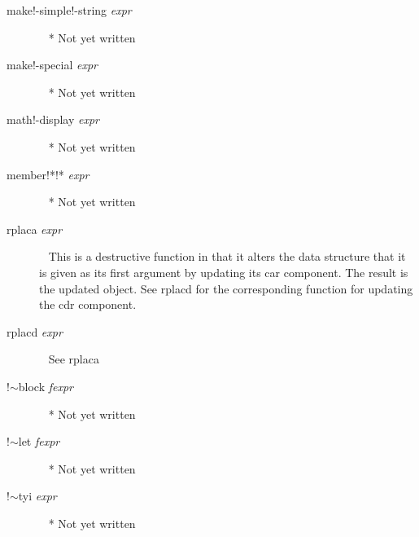\documentclass[a4paper,11pt]{article}
\begin{document}
\begin{description}
\item [{\ttfamily make!-simple!-string} {\itshape  expr}]  ~\newline
  * Not yet written

\item [{\ttfamily make!-special} {\itshape  expr}]  ~\newline
  * Not yet written

\item [{\ttfamily math!-display} {\itshape  expr}]  ~\newline
  * Not yet written

\item [{\ttfamily member!*!*} {\itshape  expr}]  ~\newline
  * Not yet written

\item[{\ttfamily rplaca} {\itshape expr}]  ~\newline
This is a destructive function in that it alters the data structure
that it is given as its first argument by updating its {\ttfamily car}
component. The result is the updated object. See {\ttfamily rplacd}
for the corresponding function for updating the {\ttfamily cdr} component.

\item [{\ttfamily rplacd} {\itshape expr}]  ~\newline
See {\ttfamily rplaca}

\item [{\ttfamily !$\sim$block} {\itshape  fexpr}]  ~\newline
  * Not yet written

\item [{\ttfamily !$\sim$let} {\itshape  fexpr}]  ~\newline
  * Not yet written

\item [{\ttfamily !$\sim$tyi} {\itshape  expr}]  ~\newline
  * Not yet written

\end{description} %

\printindex
\end{document}
